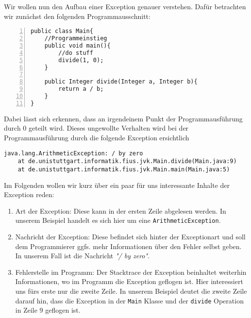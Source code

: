 \begin{Infobox}
    Wir wollen nun den Aufbau einer Exception genauer verstehen. Dafür betrachten wir zunächst den folgenden Programmausschnitt:
    \begin{lstlisting}[numbers=left,xleftmargin=2em,frame=single,framexleftmargin=1.5em]
public class Main{
    //Programmeinstieg
    public void main(){
        //do stuff
        divide(1, 0);
    }
    
    public Integer divide(Integer a, Integer b){
        return a / b;
    }
}
    \end{lstlisting}
    Dabei lässt sich erkennen, dass an irgendeinem Punkt der Programmausführung durch 0 geteilt wird.
    Dieses ungewollte Verhalten wird bei der Programmausführung durch die folgende Exception ersichtlich
    \begin{lstlisting}[keywords={}, breaklines=true, numbers=none]
java.lang.ArithmeticException: / by zero
    at de.unistuttgart.informatik.fius.jvk.Main.divide(Main.java:9)
    at de.unistuttgart.informatik.fius.jvk.Main.main(Main.java:5)
    \end{lstlisting}    
    Im Folgenden wollen wir kurz über ein paar für uns interessante Inhalte der Exception reden:
    \begin{enumerate}[label=\roman*)]
        \item Art der Exception: Diese kann in der ersten Zeile abgelesen werden. In unserem Beispiel handelt es sich hier um eine \lstinline{ArithmeticException}.
        \item Nachricht der Exception: Diese befindet sich hinter der Exceptionart und soll dem Programmierer ggfs. mehr Informationen über den Fehler selbst geben.
        In unserem Fall ist die Nachricht \textit{"/ by zero"}.
        \item Fehlerstelle im Programm: Der Stacktrace der Exception beinhaltet weiterhin Informationen, wo im Programm die Exception geflogen ist. Hier interessiert uns 
        fürs erste nur die zweite Zeile. In unserem Beispiel deutet die zweite Zeile darauf hin, dass die Exception in der \lstinline{Main} Klasse und der \lstinline{divide}
        Operation in Zeile 9 geflogen ist.
    \end{enumerate}
\end{Infobox}
